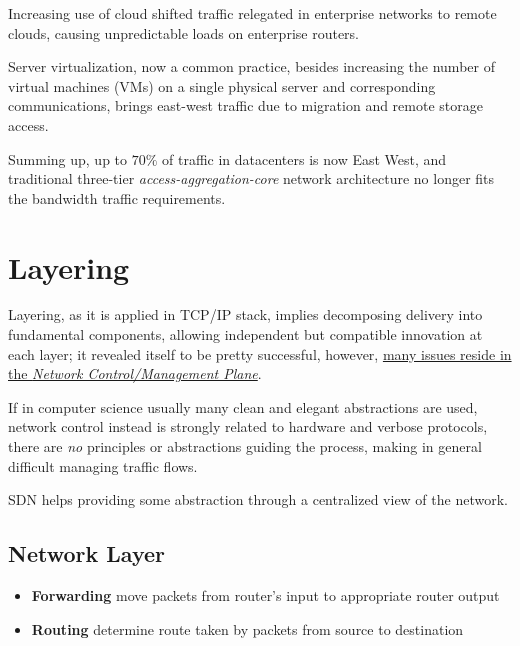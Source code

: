 Increasing use of cloud shifted traffic relegated in enterprise networks to remote clouds, causing unpredictable loads on enterprise routers.

Server virtualization, now a common practice, besides increasing the number of virtual machines (VMs) on a single physical server and corresponding communications, brings east-west traffic due to migration and remote storage access.

Summing up, up to $70\%$ of traffic in datacenters is now East West, and traditional three-tier \textit{access-aggregation-core} network architecture no longer fits the bandwidth traffic requirements.


\section{Layering}
Layering, as it is applied in TCP/IP stack, implies decomposing delivery into fundamental components, allowing independent but compatible innovation at each layer; it revealed itself to be pretty successful, however, \ul{many issues reside in the \textit{Network Control/Management Plane}}.

If in computer science usually many clean and elegant abstractions are used, network control instead is strongly related to hardware and verbose protocols, there are \textit{no} principles or abstractions guiding the process, making in general difficult managing traffic flows.

SDN helps providing some abstraction through a centralized view of the network.

\subsection{Network Layer}
\begin{itemize}
   \item \textbf{Forwarding} move packets from router’s input to appropriate router output
   \item \textbf{Routing} determine route taken by packets from
   source to destination
\end{itemize}

